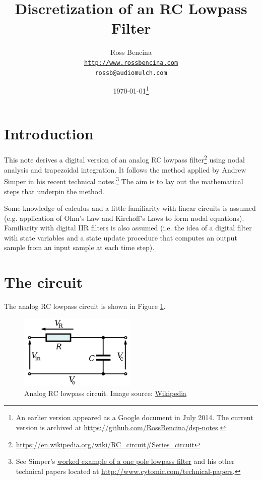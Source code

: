 \documentclass{article}
\begin{document}
\title{Discretization of an RC Lowpass Filter}
\author{
	Ross Bencina \\
	\texttt{\url{http://www.rossbencina.com}}\\
	\texttt{rossb@audiomulch.com}
}

\date{\today\footnote{An earlier version appeared as a Google document in July 2014. The current version is archived at \url{https://github.com/RossBencina/dsp-notes}. }}
	
\maketitle

\section{Introduction}

This note derives a digital version of an
analog RC lowpass filter\footnote{\url{https://en.wikipedia.org/wiki/RC_circuit#Series_circuit}}
 using nodal analysis and trapezoidal integration.
It follows the method applied by Andrew Simper in his recent technical notes.\footnote{See Simper's
\href{http://www.cytomic.com/files/dsp/OnePoleLinearLowPass.pdf}{worked example of a one pole lowpass filter} and his other technical papers located at
\url{http://www.cytomic.com/technical-papers}.}
The aim is to lay out the mathematical steps that underpin the method.

Some knowledge of calculus and a little familiarity with linear circuits is assumed (e.g. application of Ohm's Law and Kirchoff's Laws to form nodal equations). Familiarity with digital IIR filters is also assumed (i.e. the idea of a digital filter with state variables and a state update procedure that computes an output sample from an input sample at each time step).

\section{The circuit}

The analog RC lowpass circuit is shown in Figure \ref{fig:RC-lowpass-circuit}.

\begin{figure}[here]
	\centering
	\includegraphics[width=0.5\textwidth]{images/1280px-RC_Series_Filter.png}
	\caption{Analog RC lowpass circuit. 
		Image source: {\href{https://en.wikipedia.org/wiki/File:RC_Series_Filter_(with_V&I_Labels).svg}{Wikipedia}}}
	\label{fig:RC-lowpass-circuit}
\end{figure}
\end{document}
